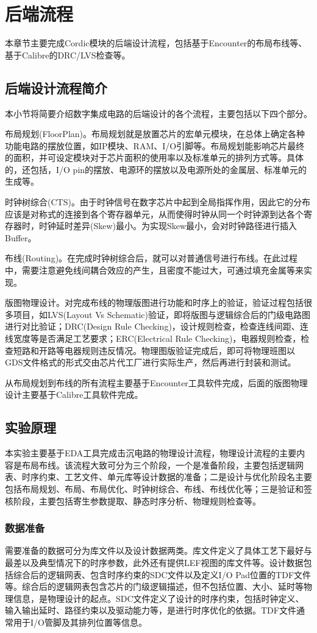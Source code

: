 \documentclass[a4paper,12pt]{report}
\begin{document}
\chapter{后端流程}
本章节主要完成Cordic模块的后端设计流程，包括基于Encounter的布局布线等、基于Calibre的DRC/LVS检查等。
\section{后端设计流程简介}
本小节将简要介绍数字集成电路的后端设计的各个流程，主要包括以下四个部分。

布局规划(FloorPlan)。布局规划就是放置芯片的宏单元模块，在总体上确定各种功能电路的摆放位置，如IP模块、RAM、I/O引脚等。布局规划能影响芯片最终的面积，并可设定模块对于芯片面积的使用率以及标准单元的排列方式等。具体的，还包括，I/O pin的摆放、电源环的摆放以及电源所处的金属层、标准单元的生成等。

时钟树综合(CTS)。由于时钟信号在数字芯片中起到全局指挥作用，因此它的分布应该是对称式的连接到各个寄存器单元，从而使得时钟从同一个时钟源到达各个寄存器时，时钟延时差异(Skew)最小。为实现Skew最小，会对时钟路径进行插入Buffer。

布线(Routing)。在完成时钟树综合后，就可以对普通信号进行布线。在此过程中，需要注意避免线间耦合效应的产生，且密度不能过大，可通过填充金属等来实现。

版图物理设计。对完成布线的物理版图进行功能和时序上的验证，验证过程包括很多项目，如LVS(Layout Vs Schematic)验证，即将版图与逻辑综合后的门级电路图进行对比验证；DRC(Design Rule Checking)，设计规则检查，检查连线间距、连线宽度等是否满足工艺要求；ERC(Electrical Rule Checking)，电器规则检查，检查短路和开路等电器规则违反情况。物理图版验证完成后，即可将物理班图以GDS文件格式的形式交由芯片代工厂进行实际生产，然后再进行封装和测试。

从布局规划到布线的所有流程主要基于Encounter工具软件完成，后面的版图物理设计主要基于Calibre工具软件完成。
\section{实验原理}
本实验主要基于EDA工具完成击沉电路的物理设计流程，物理设计流程的主要内容是布局布线。该流程大致可分为三个阶段，一个是准备阶段，主要包括逻辑网表、时序约束、工艺文件、单元库等设计数据的准备；二是设计与优化阶段名主要包括布局规划、布局、布局优化、时钟树综合、布线、布线优化等；三是验证和签核阶段，主要包括寄生参数提取、静态时序分析、物理规则检查等。
\subsection{数据准备}
需要准备的数据可分为库文件以及设计数据两类。库文件定义了具体工艺下最好与最差以及典型情况下的时序参数，此外还有提供LEF视图的库文件等。设计数据包括综合后的逻辑网表、包含时序约束的SDC文件以及定义I/O Pad位置的TDF文件等。综合后的逻辑网表包含芯片的门级逻辑描述，但不包括位置、大小、延时等物理信息，是物理设计的起点。SDC文件定义了设计的时序约束，包括时钟定义、输入输出延时、路径约束以及驱动能力等，是进行时序优化的依据。TDF文件通常用于I/O管脚及其排列位置等信息。
\end{document}
